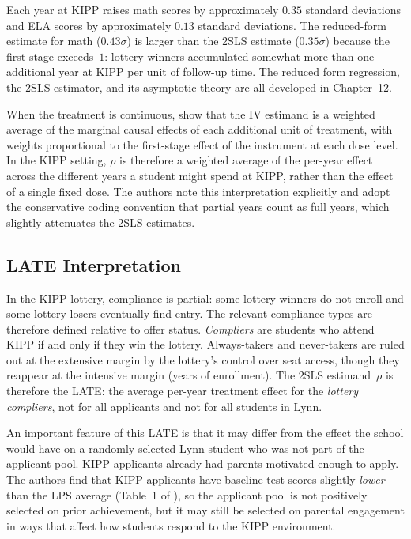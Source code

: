 \documentclass[master.tex]{subfiles}
\begin{document}
Each year at KIPP raises math scores by approximately $0.35$ standard
deviations and ELA scores by approximately $0.13$ standard deviations.
The reduced-form estimate for math ($0.43\sigma$) is larger than the
2SLS estimate ($0.35\sigma$) because the first stage exceeds~$1$:
lottery winners accumulated somewhat more than one additional year at
KIPP per unit of follow-up time.  The reduced form regression, the
2SLS estimator, and its asymptotic theory are all developed in
Chapter~12.

\begin{tcolorbox}[remarkstyle, title={Remark: Treatment Heterogeneity and the Weighted-Average Interpretation}]
When the treatment is continuous, \citet{angrist1995two} show that
the IV estimand is a weighted average of the marginal causal effects
of each additional unit of treatment, with weights proportional to
the first-stage effect of the instrument at each dose level.  In the
KIPP setting, $\rho$ is therefore a weighted average of the
per-year effect across the different years a student might spend at
KIPP, rather than the effect of a single fixed dose.  The authors
note this interpretation explicitly and adopt the conservative coding
convention that partial years count as full years, which slightly
attenuates the 2SLS estimates.
\end{tcolorbox}

\subsection{LATE Interpretation}

In the KIPP lottery, compliance is partial: some lottery winners do
not enroll and some lottery losers eventually find entry.  The
relevant compliance types are therefore defined relative to offer
status.  \emph{Compliers} are students who attend KIPP if and only
if they win the lottery.  Always-takers and never-takers are ruled
out at the extensive margin by the lottery's control over seat
access, though they reappear at the intensive margin (years of
enrollment).  The 2SLS estimand~$\rho$ is therefore the LATE: the
average per-year treatment effect for the \emph{lottery compliers},
not for all applicants and not for all students in Lynn.

An important feature of this LATE is that it may differ from the
effect the school would have on a randomly selected Lynn student who
was not part of the applicant pool.  KIPP applicants already had
parents motivated enough to apply.  The authors find that KIPP
applicants have baseline test scores slightly \emph{lower} than the
LPS average (Table~1 of \citealt{angrist2012benefits}), so the
applicant pool is not positively selected on prior achievement, but
it may still be selected on parental engagement in ways that affect
how students respond to the KIPP environment.
\end{document}
